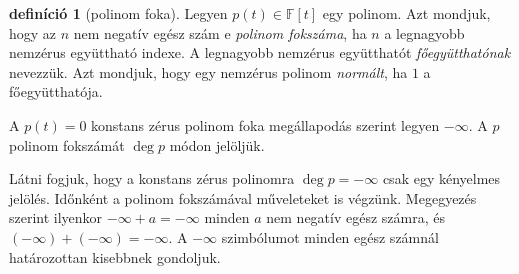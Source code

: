 \documentclass[9pt, a4paper, showtrims]{memoir}
\theoremstyle{plain}
\theoremstyle{remark}
\theoremstyle{definition}
\newtheorem{definition}[proposition]{definíció}
\begin{document}
\begin{definition}[polinom foka]
	Legyen $p\left( t \right)\in\mathbb{F}\left[ t \right]$ egy polinom.
	Azt mondjuk, hogy az $n$ nem negatív egész szám e \emph{polinom fokszáma},
	ha $n$ a legnagyobb nemzérus együttható indexe.
	A legnagyobb nemzérus együtthatót \emph{főegyütthatónak} nevezzük.
	Azt mondjuk, hogy egy nemzérus polinom \emph{normált}, ha $1$ a főegyütthatója.

	A $p\left( t \right)=0$ konstans zérus polinom foka megállapodás szerint legyen $-\infty$.
	A $p$ polinom fokszámát $\deg p$ módon jelöljük.
\end{definition}
Látni fogjuk, hogy a konstans zérus polinomra $\deg p=-\infty$ csak egy kényelmes jelölés.
Időnként a polinom fokszámával műveleteket is végzünk.
Megegyezés szerint ilyenkor $-\infty+a=-\infty$ minden $a$ nem negatív egész számra,
és $\left( -\infty \right)+\left( -\infty \right)=-\infty.$
A $-\infty$ szimbólumot minden egész számnál határozottan kisebbnek gondoljuk.
\end{document}
